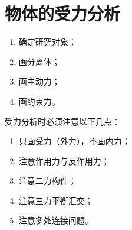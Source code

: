 \section{物体的受力分析}


\begin{enumerate}
  \item 确定研究对象；
  \item 画分离体；
  \item 画主动力；
  \item 画约束力。
\end{enumerate}



受力分析时必须注意以下几点：
\begin{enumerate}
  \item 只画受力（外力），不画内力；
  \item 注意作用力与反作用力；
  \item 注意二力构件；
  \item 注意三力平衡汇交；
  \item 注意多处连接问题。
\end{enumerate}


